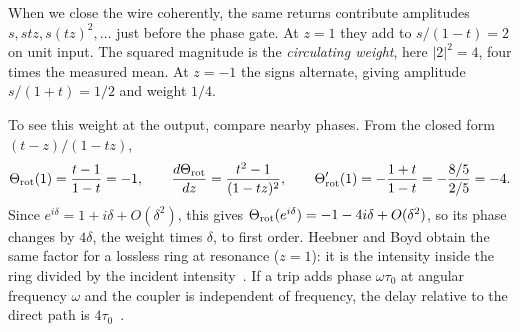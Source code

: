 \documentclass[acmsmall,screen,review,anonymous,nonacm]{acmart}
\numberwithin{equation}{section}
\begin{document}
When we close the wire coherently, the same returns contribute amplitudes
$s,stz,s(tz)^2,\ldots$ just before the phase gate. At $z=1$ they add to
$s/(1-t)=2$ on unit input. The squared magnitude is the
\emph{circulating weight}, here $|2|^2=4$, four times the measured mean. At $z=-1$ the signs alternate,
giving amplitude $s/(1+t)=1/2$ and weight $1/4$.

To see this weight at the output, compare nearby phases. From the closed form $(t-z)/(1-tz)$,
\[
 \Theta_{\rm rot}(1)=\frac{t-1}{1-t}=-1,
 \qquad
 \frac{d\Theta_{\rm rot}}{dz}=\frac{t^2-1}{(1-tz)^2},
 \qquad
 \Theta_{\rm rot}'(1)=-\frac{1+t}{1-t}=-\frac{8/5}{2/5}=-4 .
\]
Since $e^{i\delta}=1+i\delta+O(\delta^2)$, this gives
$\Theta_{\rm rot}(e^{i\delta})=-1-4i\delta+O(\delta^2)$, so its phase
changes by $4\delta$, the weight times $\delta$, to first order. Heebner and Boyd obtain the same factor for a
lossless ring at resonance ($z=1$): it is the intensity inside the ring divided by
the incident intensity~\cite[p.~848, Eq.~(7)]{HeebnerBoyd99Ring}. If a trip adds phase $\omega\tau_0$ at angular frequency $\omega$ and the coupler is independent of frequency, the delay relative to the direct path is $4\tau_0$~\cite{Wigner55Phase,Smith60LifetimeMatrix}.
\end{document}
